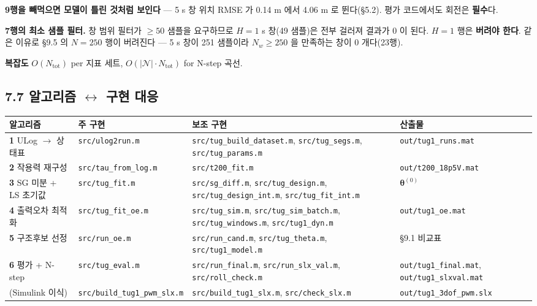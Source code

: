 \documentclass[10pt,a4paper]{article}
\begin{document}
\textbf{9행을 빼먹으면 모델이 틀린 것처럼 보인다} --- 5 s 창 위치 RMSE 가 0.14 m 에서 4.06 m 로 뛴다(\S{}5.2). 평가 코드에서도 회전은 \textbf{필수}다.

\textbf{7행의 최소 샘플 필터.} 창 범위 필터가 $\ge 50$ 샘플을 요구하므로 $H = 1$ s 창(49 샘플)은 전부 걸러져 결과가 0 이 된다. $H = 1$ 행은 \textbf{버려야 한다}. 같은 이유로 \S{}9.5 의 $N = 250$ 행이 버려진다 --- 5 s 창이 251 샘플이라 $N_w \ge 250$ 을 만족하는 창이 0 개다(23행).

\textbf{복잡도} $O(N_{\text{tot}})$ per 지표 세트, $O(|\mathcal{N}| \cdot N_{\text{tot}})$ for N-step 곡선.

\subsection*{7.7 알고리즘 $\leftrightarrow$ 구현 대응}

\begin{center}\footnotesize\setlength{\tabcolsep}{3pt}
\begin{tabular}{@{}llp{5.36cm}p{2.90cm}@{}}
\toprule
\textbf{알고리즘} & \textbf{주 구현} & \textbf{보조 구현} & \textbf{산출물} \\
\midrule
\textbf{1} ULog $\to$ 상태표 & \texttt{src/ulog2run.m} & \texttt{src/tug\_build\_dataset.m}, \texttt{src/tug\_segs.m}, \texttt{src/tug\_params.m} & \texttt{out/tug1\_runs.mat} \\
\textbf{2} 작용력 재구성 & \texttt{src/tau\_from\_log.m} & \texttt{src/t200\_fit.m} & \texttt{out/t200\_18p5V.mat} \\
\textbf{3} SG 미분 + LS 초기값 & \texttt{src/tug\_fit.m} & \texttt{src/sg\_diff.m}, \texttt{src/tug\_design.m}, \texttt{src/tug\_design\_int.m}, \texttt{src/tug\_fit\_int.m} & $\boldsymbol{\theta}^{(0)}$ \\
\textbf{4} 출력오차 최적화 & \texttt{src/tug\_fit\_oe.m} & \texttt{src/tug\_sim.m}, \texttt{src/tug\_sim\_batch.m}, \texttt{src/tug\_windows.m}, \texttt{src/tug1\_dyn.m} & \texttt{out/tug1\_oe.mat} \\
\textbf{5} 구조후보 선정 & \texttt{src/run\_oe.m} & \texttt{src/run\_cand.m}, \texttt{src/tug\_theta.m}, \texttt{src/tug1\_model.m} & \S{}9.1 비교표 \\
\textbf{6} 평가 + N-step & \texttt{src/tug\_eval.m} & \texttt{src/run\_final.m}, \texttt{src/run\_slx\_val.m}, \texttt{src/roll\_check.m} & \texttt{out/tug1\_final.mat}, \texttt{out/tug1\_slxval.mat} \\
(Simulink 이식) & \texttt{src/build\_tug1\_pwm\_slx.m} & \texttt{src/build\_tug1\_slx.m}, \texttt{src/check\_slx.m} & \texttt{out/tug1\_3dof\_pwm.slx} \\
\bottomrule
\end{tabular}
\end{center}
\end{document}
